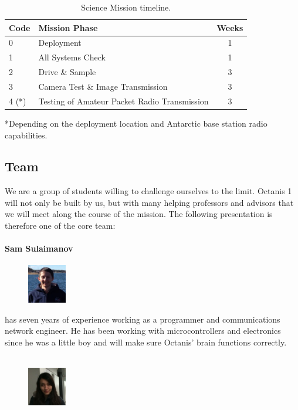 \documentclass[a4paper,12pt]{article}
\begin{document}
\begin{table}[h!]
\centering
\begin{tabular}{ l | l | c }
\bfseries{Code} & \bfseries{Mission Phase} & \bfseries{Weeks} \\
\hline

0 & Deployment & 1 \\
1 & All Systems Check & 1 \\
2 & Drive \& Sample & 3 \\
3 & Camera Test \& Image Transmission & 3 \\
4 (*)& Testing of Amateur Packet Radio Transmission  & 3 \\

\end{tabular}
\caption{Science Mission timeline.}
\end{table}
*Depending on the deployment location and Antarctic base station radio capabilities.

\subsection{Team}

We are a group of students willing to challenge ourselves to the limit. Octanis 1 will not only be built by us, but with many helping professors and advisors that we will meet along the course of the mission. The following presentation is therefore one of the core team:


\paragraph{Sam Sulaimanov} 
\begin{figure}
    \centering
    \vspace{-13pt}
    \includegraphics[width=0.15\textwidth]{sam}
\end{figure} has seven years of experience working as a programmer and communications network engineer. He has been working with microcontrollers and electronics since he was a little boy and will make sure Octanis' brain functions correctly.
\\ \\

\begin{figure}
    \centering
    \vspace{-13pt}
    \includegraphics[width=0.15\textwidth]{ana}
\end{figure}
\end{document}

